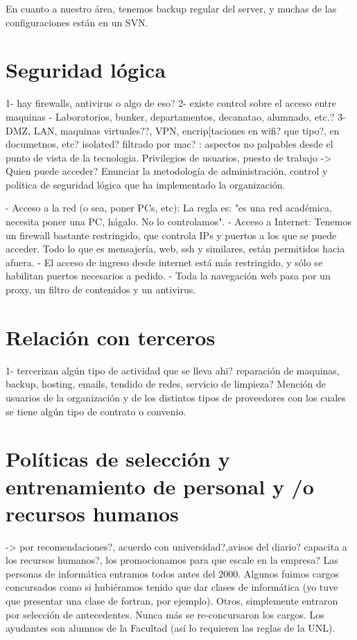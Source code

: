 \documentclass[10pt,a4paper,final]{article}
\begin{document}
En cuanto a nuestro área, tenemos backup regular del server, y muchas de las configuraciones están en un SVN. 
\section{Seguridad lógica}
1- hay firewalls, antivirus o algo de eso?
2- existe control sobre el acceso entre maquinas - Laboratorios, bunker, departamentos, decanatao, alumnado, etc.?
3- DMZ, LAN, maquinas virtuales??, VPN, encrip[taciones en wifi? que tipo?, en documetnos, etc? isolated? filtrado por mac?
: aspectos no palpables desde el punto de vista de la tecnologia. Privilegios de usuarios, puesto de trabajo -> Quien puede acceder? 
Enunciar la metodología de administración, control y política de seguridad lógica que ha implementado la organización.


- Acceso a la red (o sea, poner PCs, etc): La regla es: "es una red académica, necesita poner una PC, hágalo. No lo controlamos".
- Acceso a Internet: Tenemos un firewall bastante restringido, que controla IPs y puertos a los que se puede acceder. Todo lo que es mensajería, web, ssh y similares, están permitidos hacia afuera.
  - El acceso de ingreso desde internet está más restringido, y sólo se habilitan puertos necesarios a pedido.
- Toda la navegación web pasa por un proxy, un filtro de contenidos y un antivirus.
\section{Relación con terceros}
1- tercerizan algún tipo de actividad que se lleva ahi? reparación de maquinas, backup, hosting, emails, tendido de redes, servicio de limpieza?
Mención de usuarios de la organización y de los distintos tipos de proveedores con los cuales se tiene algún tipo de contrato o convenio.

\section{Políticas de selección y entrenamiento de personal y /o recursos humanos}
 -> por recomendaciones?, acuerdo con universidad?,avisos del diario? capacita a los recursos humanos?, los promocionamos para que escale en la empresa?
   Las personas de informática entramos todos antes del 2000. Algunos fuimos cargos concursados como si hubiéramos tenido que dar clases de informática (yo tuve que presentar una clase de fortran, por ejemplo). Otros, simplemente entraron por selección de antecedentes. Nunca más se re-concursaron los cargos. Los ayudantes son alumnos de la Facultad (así lo requieren las reglas de la UNL).
\end{document}
